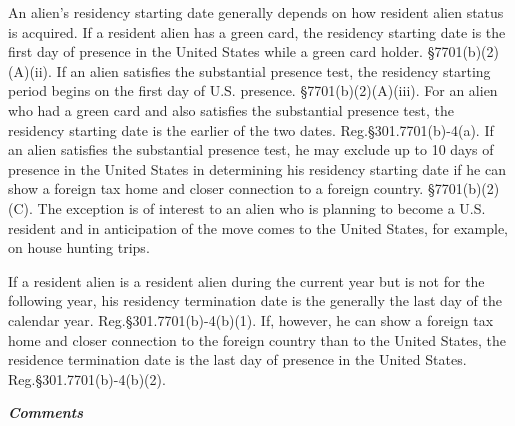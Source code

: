 An alien's residency starting date generally depends on how resident alien status is acquired.  If a resident alien has a green card, the residency starting date is the first day of presence in the United States while a green card holder.  \S7701(b)(2)(A)(ii).  If an alien satisfies the substantial presence test, the residency starting period begins on the first day of U.S. presence.  \S7701(b)(2)(A)(iii).  For an alien who had a green card and also satisfies the substantial presence test, the residency starting date is the earlier of the two dates.  Reg.\@ \S301.7701(b)-4(a).  If an alien satisfies  the substantial presence test, he may exclude up to 10 days of presence in the United States in determining his residency starting date if he can show a foreign tax home and closer connection to a foreign country.  \S7701(b)(2)(C).  The exception is of interest to an alien who is planning to become a U.S. resident and in anticipation of the move comes to the United States, for example, on house hunting trips.

If a resident alien is a resident alien during the current year but is not for the following year, his residency termination date is the generally the last day of the calendar year. Reg.\@ \S301.7701(b)-4(b)(1).  If, however, he can show a foreign tax home and closer connection to the foreign country than to the United States, the residence termination date is the last day of presence in the United States.  Reg.\@ \S301.7701(b)-4(b)(2). 

	\begin{center}
			\emph{\textbf{Comments}}
	\end{center}

